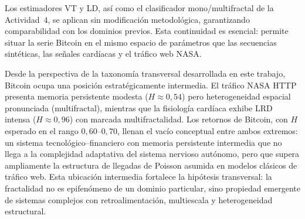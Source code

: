 Los estimadores VT y LD, así como el clasificador mono/multifractal de la
Actividad~4, se aplican sin modificación metodológica, garantizando
comparabilidad con los dominios previos. Esta continuidad es esencial:
permite situar la serie Bitcoin en el mismo espacio de parámetros que las
secuencias sintéticas, las señales cardíacas y el tráfico web NASA.

Desde la perspectiva de la taxonomía transversal desarrollada en este
trabajo, Bitcoin ocupa una posición estratégicamente intermedia. El tráfico
NASA HTTP presenta memoria persistente modesta ($H \approx 0{,}54$) pero
heterogeneidad espacial pronunciada (multifractal), mientras que la
fisiología cardíaca exhibe LRD intensa ($H \approx 0{,}96$) con marcada
multifractalidad. Los retornos de Bitcoin, con $H$ esperado en el rango
$0{,}60$--$0{,}70$, llenan el vacío conceptual entre ambos extremos:
un sistema tecnológico--financiero con memoria persistente intermedia que
no llega a la complejidad adaptativa del sistema nervioso autónomo, pero
que supera ampliamente la estructura de llegadas de Poisson asumida en
modelos clásicos de tráfico web. Esta ubicación intermedia fortalece la
hipótesis transversal: la fractalidad no es epifenómeno de un dominio
particular, sino propiedad emergente de sistemas complejos con
retroalimentación, multiescala y heterogeneidad estructural.
